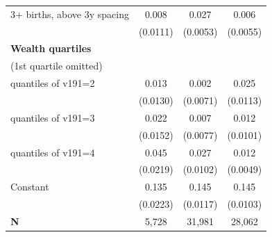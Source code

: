 {\begin{tabular}{l*{3}{c}}
\addlinespace
\hspace*{1em}3+ births, above 3y spacing&       0.008         &       0.027\sym{***}&       0.006         \\
                    &    (0.0111)         &    (0.0053)         &    (0.0055)         \\
\addlinespace
\textbf{Wealth quartiles} \\ (1st quartile omitted)&                     &                     &                     \\
\addlinespace
4 quantiles of v191=2&       0.013         &       0.002         &       0.025\sym{*}  \\
                    &    (0.0130)         &    (0.0071)         &    (0.0113)         \\
\addlinespace
4 quantiles of v191=3&       0.022         &       0.007         &       0.012         \\
                    &    (0.0152)         &    (0.0077)         &    (0.0101)         \\
\addlinespace
4 quantiles of v191=4&       0.045\sym{*}  &       0.027\sym{**} &       0.012\sym{*}  \\
                    &    (0.0219)         &    (0.0102)         &    (0.0049)         \\
\addlinespace
\hspace*{1em}Constant            &       0.135\sym{***}&       0.145\sym{***}&       0.145\sym{***}\\
                    &    (0.0223)         &    (0.0117)         &    (0.0103)         \\
\midrule
\textbf{N}          &       5,728         &      31,981         &      28,062         \\
\bottomrule
\end{tabular}
}
